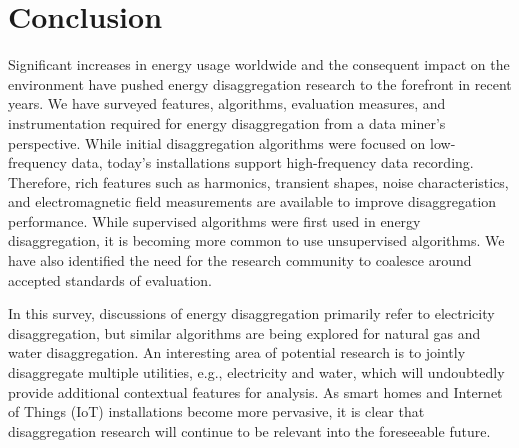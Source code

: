 \section{Conclusion}
\label{sec:conclusion}
Significant increases in energy usage worldwide and the consequent impact
on the environment have pushed energy disaggregation research to the
forefront in recent years. 
We have surveyed features, algorithms, evaluation measures, and 
instrumentation required for energy disaggregation 
from a data miner's perspective.
While initial
disaggregation algorithms were focused on low-frequency data,
today's installations support
high-frequency data recording.
Therefore, rich features such as harmonics, transient shapes, 
noise characteristics, and electromagnetic field
measurements are available to improve disaggregation performance.
While supervised algorithms were first used in energy disaggregation, 
it is becoming more common to use unsupervised algorithms.
We have also identified the need for the research community to coalesce
around accepted standards of evaluation. 

In this survey, discussions of 
energy disaggregation primarily refer to electricity disaggregation,
but similar algorithms are being explored for natural gas and water disaggregation. 
An interesting area of potential research is to jointly disaggregate multiple
utilities, e.g., electricity and water, which will undoubtedly provide additional
contextual features for analysis.
As smart homes and Internet of Things (IoT) installations become more
pervasive, it is clear that disaggregation research will continue to be
relevant into the foreseeable future.

